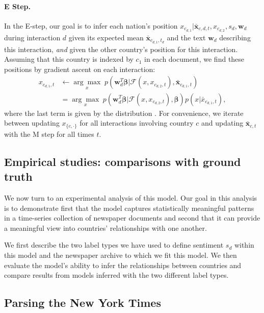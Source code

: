 \paragraph{E Step.} In the E-step, our goal is to infer each nation's
position $x_{c_{d,1}} | \bm \bar{x}_{c,d,t}, x_{c_{d,2}}, s_d, \bm
w_d$ during interaction $d$ given its expected mean $\bm \bar
x_{c_{d,1},t_d}$ and the text $\bm w_d$ describing this interaction,
\emph{and} given the other country's position for this interaction.
Assuming that this country is indexed by $c_1$ in each document, we
find these positions by gradient ascent on each interaction:
\begin{align}
  x_{c_{d, 1}, t} & \gets \underset{ x }
  {\arg \max}\hspace{3pt}
  p(\bm w_d^T \bm \beta | \mathcal{F}(x, x_{c_{d,2},t}),
  \bm \bar x_{c_{d,1},t} ) \nonumber \\
  & = \underset{x}
  { \arg \max }\hspace{3pt}
  p(\bm w_d^T \bm \beta | \mathcal{F}(x, x_{c_{d,2},t}),
  \bm \beta)
  p(x | \bar x_{c_{d,1},t} ),
\end{align}
where the last term is given by the distribution
.  For convenience, we
iterate between updating $x_{\{c,\cdot\}}$ for all interactions
involving country $c$ and updating $\bm \bar x_{c,t}$ with the M step
for all times $t$.

\subsection{Empirical studies: comparisons with ground truth}
We now turn to an experimental analysis of this model.  Our goal in
this analysis is to demonstrate first that the model captures
statistically meaningful patterns in a time-series collection of
newspaper documents and second that it can provide a meaningful view
into countries' relationships with one another.

We first describe the two label types we have used to define sentiment $s_d$
within this model and the newspaper archive to which we fit this
model.  We then evaluate the model's ability to infer the
relationships between countries and compare results from models
inferred with the two different label types.

\subsection{Parsing the New York Times}

